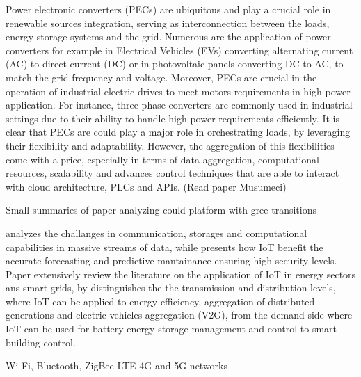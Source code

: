 Power electronic converters (PECs) are ubiquitous and play a crucial role in renewable sources integration, serving 
as interconnection between the loads, energy storage systems and the grid.
Numerous are the application of power converters 
for example in Electrical Vehicles (EVs) converting alternating current (AC) to direct current (DC) or in 
photovoltaic panels converting DC to AC, to match the grid frequency and voltage. 
Moreover, PECs are crucial in the operation of industrial electric drives to meet 
motors requirements in high power application. 
For instance, three-phase converters are commonly used in industrial settings 
due to their ability to handle high power requirements efficiently.
It is clear that PECs are could play a major role in orchestrating loads, 
by leveraging their flexibility and adaptability. 
However, the aggregation of this flexibilities come with a price,
especially in terms of data aggregation, computational resources, scalability and advances control 
techniques that are able to interact with cloud architecture, PLCs and APIs. (Read paper Musumeci) 


Small summaries of paper analyzing could platform with gree transitions


\cite{bagherzadeh2020integration} analyzes the challanges in communication, storages and computational capabilities in 
massive streams of data, while \cite{shahinzadeh2018green} presents how IoT benefit the accurate forecasting and predictive mantainance ensuring high security levels. 
Paper \cite{hossein2020internet} extensively review the literature on the application of IoT in energy sectors ans smart grids, by 
distinguishes the the transmission and distribution levels, where IoT can be applied to energy efficiency, aggregation of distributed generations and electric vehicles
aggregation (V2G), from the demand side where IoT can be used for battery energy storage management and control to smart building control. 

Wi-Fi, Bluetooth, ZigBee \cite{karunarathne2018wireless} LTE-4G and 5G networks \cite{li20185g}
